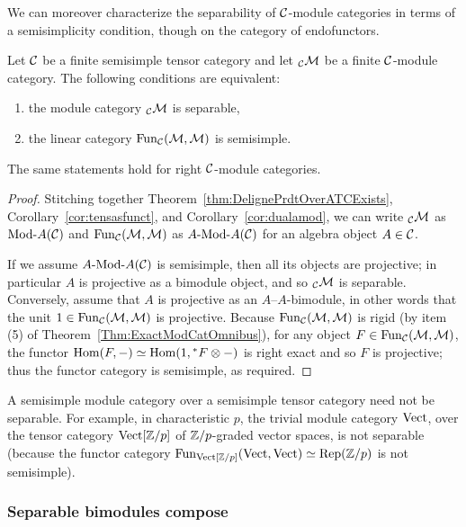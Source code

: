\documentclass{amsart}
\begin{document}
We can moreover characterize the separability of $\mathcal C$-module categories in terms of a semisimplicity condition, though on the category of endofunctors.
\begin{theorem} \label{thm:SepModCats}
Let $\mathcal C$ be a finite semisimple tensor category and let ${}_\mathcal C \mathcal M$ be a finite $\mathcal C$-module category.  The following conditions are equivalent:
\begin{enumerate}
\item the module category ${}_\mathcal C \mathcal M$ is separable,
\item the linear category $\operatorname{Fun}_{\mathcal C}(\mathcal M,\mathcal M)$ is semisimple.  
\end{enumerate}
The same statements hold for right $\mathcal C$-module categories.
\end{theorem}
\begin{proof}
Stitching together Theorem~\ref{thm:DelignePrdtOverATCExists}, Corollary~\ref{cor:tensasfunct}, and Corollary~\ref{cor:dualamod}, we can write ${}_\mathcal C \mathcal M$ as $\Mod{}{A}(\cC)$ and $\operatorname{Fun}_{\mathcal C}(\mathcal M,\mathcal M)$ as $\Mod{A}{A}(\cC)$ for an algebra object $A \in \mathcal C$.  

If we assume $\Mod{A}{A}(\cC)$ is semisimple, then all its objects are projective; in particular $A$ is projective as a bimodule object, and so ${}_\mathcal C \mathcal M$ is separable.  Conversely, assume that $A$ is projective as an $A$--$A$-bimodule, in other words that the unit $1 \in \operatorname{Fun}_{\mathcal C}(\mathcal M,\mathcal M)$ is projective.  Because $\operatorname{Fun}_{\mathcal C}(\mathcal M,\mathcal M)$ is rigid (by item (5) of Theorem~\ref{Thm:ExactModCatOmnibus}), for any object $F \in \operatorname{Fun}_{\mathcal C}(\mathcal M,\mathcal M)$, the functor $\operatorname{Hom}(F,-) \simeq \operatorname{Hom}(1,{}^* F \otimes -)$ is right exact and so $F$ is projective; thus the functor category is semisimple, as required.
\end{proof}

A semisimple module category over a semisimple tensor category need not be separable.  For example, in characteristic $p$, the trivial module category $\mathrm{Vect}$, over the tensor category $\mathrm{Vect}[\mathbb Z/p]$ of $\mathbb Z/p$-graded vector spaces, is not separable (because the functor category $\operatorname{Fun}_{\mathrm{Vect}[\mathbb Z/p]}(\mathrm{Vect},\mathrm{Vect}) \simeq \mathrm{Rep}(\mathbb Z/p)$ is not semisimple). %


\subsubsection{Separable bimodules compose}
\end{document}
